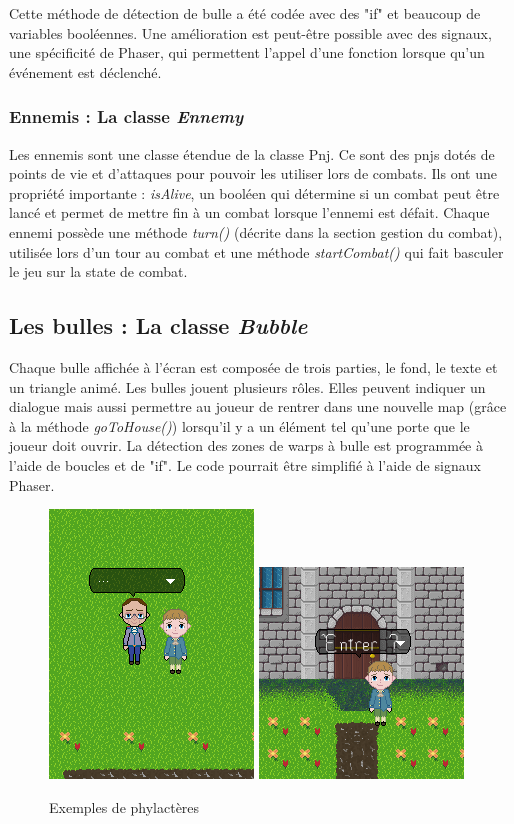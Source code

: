 \documentclass[11pt]{article}
\begin{document}
Cette méthode de détection de bulle a été codée avec des "if" et beaucoup de variables booléennes. Une amélioration est peut-être possible avec des signaux, une spécificité de Phaser, qui permettent l'appel d'une fonction lorsque qu'un événement est déclenché.\subsubsection{Ennemis : La classe \textit{Ennemy}}
Les ennemis sont une classe étendue de la classe Pnj. Ce sont des pnjs dotés de points de vie et d'attaques pour pouvoir les utiliser lors de combats. Ils ont une propriété importante : \textit{isAlive}, un booléen qui détermine si un combat peut être lancé et permet de mettre fin à un combat lorsque l'ennemi est défait. Chaque ennemi possède une méthode \textit{turn()} (décrite dans la section gestion du combat), utilisée lors d'un tour au combat et une méthode \textit{startCombat()} qui fait basculer le jeu sur la state de combat.
\subsection{Les bulles : La classe \textit{Bubble}}
 Chaque bulle affichée à l'écran est composée de trois parties, le fond, le texte et un triangle animé. Les bulles jouent plusieurs rôles. Elles peuvent indiquer un dialogue mais aussi permettre au joueur de rentrer dans une nouvelle map (grâce à la méthode \textit{goToHouse()}) lorsqu'il y a un élément tel qu'une porte que le joueur doit ouvrir. La détection des zones de warps à bulle est programmée à l'aide de boucles et de "if". Le code pourrait être simplifié à l'aide de signaux Phaser.
\begin{figure}[H]
\includegraphics[scale=0.5]{bulleDialog}
\includegraphics[scale=0.5]{bulleMaison}
\centering
\caption{Exemples de phylactères}
\end{figure}
\end{document}

